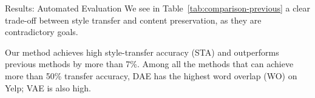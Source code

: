\documentclass[final]{beamer}
\newlength{\onecolwid}
\newlength{\twocolwid}
\begin{document}
\begin{frame}[t]
\begin{columns}[t]
\begin{column}{\twocolwid}
\begin{columns}[t,totalwidth=\twocolwid]
\begin{column}{\onecolwid}

                \end{column} %

            \end{columns} %






            \begin{columns}[t,totalwidth=\twocolwid] %

                \begin{column}{\onecolwid} %

                    \begin{block}{Results: Automated Evaluation}
                        We see in Table~\ref{tab:comparison-previous} a clear trade-off between style transfer and content preservation, as they are contradictory goals.

                        Our method achieves high style-transfer accuracy (STA) and outperforms previous methods by more than 7\%. Among all the methods that can achieve more than 50\% transfer accuracy, DAE has the highest word overlap (WO) on Yelp; VAE is also high.


\end{block}
\end{column}
\end{columns}
\end{column}
\end{columns}
\end{frame}
\end{document}
